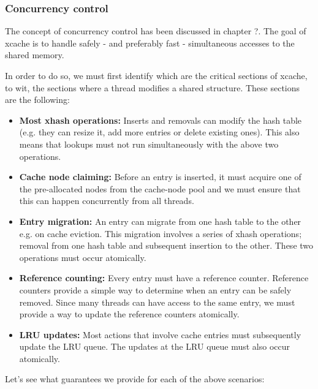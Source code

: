 \subsubsection{Concurrency control}

The concept of concurrency control has been discussed in chapter ?. The goal of 
xcache is to handle safely - and preferably fast - simultaneous accesses to the 
shared memory.

In order to do so, we must first identify which are the critical sections of 
xcache, to wit, the sections where a thread modifies a shared structure. These 
sections are the following:

\begin{itemize}
	\item
		\textbf{Most xhash operations:} Inserts and removals can modify 
		the hash table (e.g. they can resize it, add more entries or 
		delete existing ones). This also means that lookups must not 
		run simultaneously with the above two operations.
	\item
		\textbf{Cache node claiming:} Before an entry is inserted, it 
		must	acquire one of the pre-allocated nodes from the 
		cache-node pool and we must ensure that this can happen 
		concurrently from all threads.
	\item
		\textbf{Entry migration:} An entry can migrate from one hash 
		table to the other e.g. on cache eviction. This migration 
		involves a series of xhash operations; removal from one hash 
		table and subsequent insertion to the other. These two 
		operations must occur atomically.
	\item
		\textbf{Reference counting:} Every entry must have a reference 
		counter.  Reference counters provide a simple way to determine 
		when an entry can be safely removed. Since many threads can 
		have access to the same entry, we must provide a way to update 
		the reference counters atomically.
	\item
		\textbf{LRU updates:} Most actions that involve cache entries 
		must subsequently update the LRU queue. The updates at the LRU 
		queue must also occur atomically.
\end{itemize}

Let's see what guarantees we provide for each of the above scenarios:

